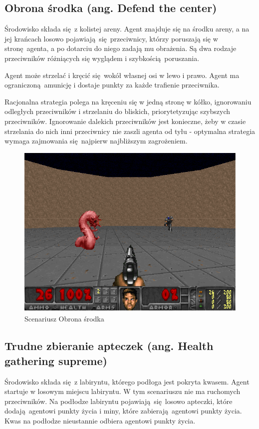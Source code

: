 \documentclass[polish,master,a4paper,oneside]{ppfcmthesis}
\begin{document}
\subsection{Obrona środka (ang. Defend the center)}\label{scenario_dtc}
Środowisko składa się z kolistej areny. Agent znajduje się na środku areny, a na jej krańcach losowo pojawiają się przeciwnicy, którzy poruszają się w stronę agenta, a po dotarciu do niego zadają mu obrażenia. Są dwa rodzaje przeciwników różniących się wyglądem i szybkością poruszania.

Agent może strzelać i kręcić się wokół własnej osi w lewo i prawo. Agent ma ograniczoną amunicję i dostaje punkty za każde trafienie przeciwnika.

Racjonalna strategia polega na kręceniu się w jedną stronę w kółko, ignorowaniu odległych przeciwników i strzelaniu do bliskich, priorytetyzując szybszych przeciwników. Ignorowanie dalekich przeciwników jest konieczne, żeby w czasie strzelania do nich inni przeciwnicy nie zaszli agenta od tyłu - optymalna strategia wymaga zajmowania się najpierw najbliższym zagrożeniem.

\begin{center}
\begin{figure}[H]
\includegraphics[scale = 0.4]{figures/screens/scenarios/dtc.png}{\caption{Scenariusz Obrona środka}\label{fig:scenario_dtc}}
\end{figure}
\end{center}

\subsection{Trudne zbieranie apteczek (ang. Health gathering supreme) }\label{scenario_hgs}
Środowisko składa się z labiryntu, którego podłoga jest pokryta kwasem. Agent startuje w losowym miejscu labiryntu. W tym scenariuszu nie ma ruchomych przeciwników. Na podłodze labiryntu pojawiają się losowo apteczki, które dodają agentowi punkty życia i miny, które zabierają agentowi punkty życia. Kwas na podłodze nieustannie odbiera agentowi punkty życia. 
\end{document}
